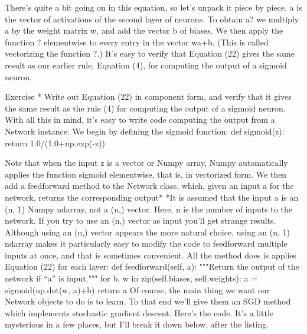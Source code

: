 There's quite a bit going on in this equation, so let's unpack it piece by piece. a is the vector of activations of the second layer of neurons. To obtain a? we multiply a by the weight matrix w, and add the vector b of biases. We then apply the function ? elementwise to every entry in the vector wa+b. (This is called vectorizing the function ?.) It's easy to verify that Equation (22) gives the same result as our earlier rule, Equation (4), for computing the output of a sigmoid neuron.

Exercise
* Write out Equation (22) in component form, and verify that it gives the same result as the rule (4) for computing the output of a sigmoid neuron. 
With all this in mind, it's easy to write code computing the output from a Network instance. We begin by defining the sigmoid function: 
def sigmoid(z):
    return 1.0/(1.0+np.exp(-z))

Note that when the input z is a vector or Numpy array, Numpy automatically applies the function sigmoid elementwise, that is, in vectorized form.
We then add a feedforward method to the Network class, which, given an input a for the network, returns the corresponding output* 
*It is assumed that the input a is an (n, 1) Numpy ndarray, not a (n,) vector. Here, n is the number of inputs to the network. If you try to use an (n,) vector as input you'll get strange results. Although using an (n,) vector appears the more natural choice, using an (n, 1) ndarray makes it particularly easy to modify the code to feedforward multiple inputs at once, and that is sometimes convenient. 
All the method does is applies Equation (22) for each layer: 
    def feedforward(self, a):
        """Return the output of the network if ``a'' is input."""
        for b, w in zip(self.biases, self.weights):
            a = sigmoid(np.dot(w, a)+b)
        return a
Of course, the main thing we want our Network objects to do is to learn. To that end we'll give them an SGD method which implements stochastic gradient descent. Here's the code. It's a little mysterious in a few places, but I'll break it down below, after the listing.

